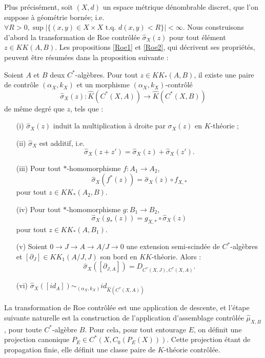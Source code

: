 Plus précisément, soit $(X,d)$ un espace métrique dénombrable discret, que l'on suppose à géométrie bornée; i.e. $\forall R>0,\sup | \{ (x,y) \in X\times X \text{ t.q. }d(x,y)<R\} |<\infty$. Nous construisons d'abord la transformation de Roe contrôlée $\hat\sigma_X(z)$ pour tout élément $z\in KK(A,B)$. Les propositions \ref{Roe1} et \ref{Roe2}, qui décrivent ses propriétés, peuvent être résumées dans la proposition suivante :

\begin{prop}
Soient $A$ et $B$ deux $C^*$-algèbres. Pour tout $z\in KK_*(A,B)$, il existe une paire de contrôle $(\alpha_X,k_X)$ et un morphisme $(\alpha_X,k_X)$-contrôlé
\[\hat\sigma_X(z) : \hat K(C^*(X,A))\rightarrow \hat K(C^*(X,B))\]
de même degré que $z$, tels que :
\begin{enumerate}
\item[(i)] $\hat\sigma_X(z)$ induit la multiplication à droite par $\sigma_X(z)$ en $K$-théorie ;
\item[(ii)] $\hat\sigma_X$ est additif, i.e.
\[\hat\sigma_X(z+z')=\hat\sigma_X(z)+\hat\sigma_X(z').\]
\item[(iii)] Pour tout $*$-homomorphisme $f : A_1\rightarrow A_2$,
\[\hat\sigma_X(f^*(z))=\hat\sigma_X(z)\circ f_{X,*}\] pour tout $z\in KK_*(A_2,B)$.
\item[(iv)] Pour tout $*$-homomorphisme $g : B_1\rightarrow B_2$,
\[\hat\sigma_X(g_*(z))= g_{X,*}\circ \hat\sigma_X(z)\] pour tout $z\in KK_*(A,B_1)$.
\item[(v)] Soient $0\rightarrow J\rightarrow A\rightarrow A/J\rightarrow 0$ une extension semi-scindée de $C^*$-algèbres et $[\partial_J]\in KK_1(A/J,J)$ son bord en $KK$-théorie. Alors : 
\[\hat\sigma_X([\partial_{J,A}])=D_{C^*(X,J),C^*(X,A)}.\] 
\item[(vi)] $\hat\sigma_X([id_A]) \sim_{(\alpha_X,k_X)} id_{\hat K(C^*(X,A))}$
\end{enumerate}
\end{prop}

La transformation de Roe contrôlée est une application de descente, et l'étape suivante naturelle est la construction de l'application d'assemblage contrôlée $\hat\mu_{X,B}$ , pour toute $C^*$-algèbre $B$. Pour cela, pour tout entourage $E$, on définit une projection canonique $P_E\in C^*(X,C_0(P_E(X)))$. Cette projection étant de propagation finie, elle définit une classe paire de $K$-théorie contrôlée.

